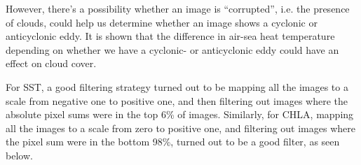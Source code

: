 \documentclass[12pt,a4paper,english]{article}
\begin{document}
    However, there's a possibility whether an image is ``corrupted'', i.e. the presence of clouds, could help us determine whether an image shows a cyclonic or anticyclonic eddy.
    It is shown that the difference in air-sea heat temperature depending on whether we have a cyclonic- or anticyclonic eddy could have an effect on cloud cover.
    
    \cite{article:frenger_2013}

    For SST, a good filtering strategy turned out to be mapping all the images to a scale from negative one to positive one, and then filtering out images where the absolute pixel sums were in the top 6\% of images.
    Similarly, for CHLA, mapping all the images to a scale from zero to positive one, and filtering out images where the pixel sum were in the bottom 98\%, turned out to be a good filter, as seen below.
    
\end{document}
